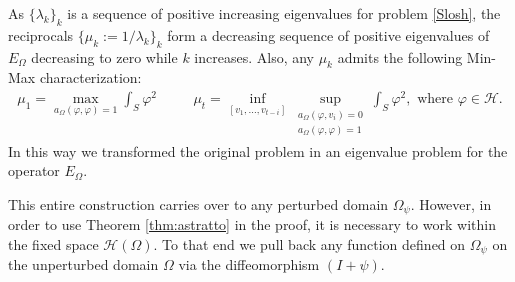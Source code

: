 \documentclass[a4paper,reqno,11pt,oneside]{amsart}
\theoremstyle{plain}
\theoremstyle{plain}
\theoremstyle{plain}
\theoremstyle{remark}
\begin{document}
As $\{\lambda_k\}_k$ is a sequence of positive increasing eigenvalues for problem  \eqref{Slosh}, the reciprocals  $\{\mu_k:=1/\lambda_k\}_k$  form a decreasing sequence of positive eigenvalues of $E_\Omega $ decreasing to zero while $k$ increases. Also, any $\mu_k$ admits the following Min-Max characterization:
\begin{eqnarray*}  
\mu_1= \max_{a_\Omega(\varphi,\varphi)=1}\int_{S}\varphi^2
&\quad&
\mu_t= 
\inf_{[v_1,\dots,v_{t-i}]}
\sup_{
\begin{array}{c}
a_\Omega(\varphi,v_i)=0\\
a_\Omega(\varphi,\varphi)=1
\end{array}}\int_{S} \varphi^2,
\text{ where } \varphi\in\mathcal{H}.
\end{eqnarray*}
In this way we transformed the original problem in an eigenvalue problem for the operator $E_\Omega$. 

This entire construction carries over to any perturbed domain $\Omega_\psi$. However, in order to use Theorem \ref{thm:astratto} in the proof,  it is necessary to work within the fixed space $\mathcal{H}(\Omega)$. To that end we pull back any function defined on $\Omega_\psi$ on the unperturbed domain $\Omega$ via the diffeomorphism $(I+\psi)$.  
\end{document}
